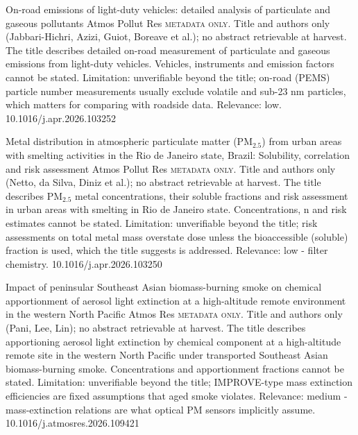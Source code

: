 \documentclass[10pt]{article}
\begin{document}
{On-road emissions of light-duty vehicles: detailed analysis of particulate and gaseous pollutants}
{Atmos Pollut Res}
{\textsc{metadata only.} Title and authors only (Jabbari-Hichri, Azizi, Guiot, Boreave et al.); no abstract retrievable at harvest. The title describes detailed on-road measurement of particulate and gaseous emissions from light-duty vehicles. Vehicles, instruments and emission factors cannot be stated. Limitation: unverifiable beyond the title; on-road (PEMS) particle number measurements usually exclude volatile and sub-23 nm particles, which matters for comparing with roadside data. Relevance: low.}
{10.1016/j.apr.2026.103252}

{Metal distribution in atmospheric particulate matter (PM$_{2.5}$) from urban areas with smelting activities in the Rio de Janeiro state, Brazil: Solubility, correlation and risk assessment}
{Atmos Pollut Res}
{\textsc{metadata only.} Title and authors only (Netto, da Silva, Diniz et al.); no abstract retrievable at harvest. The title describes PM$_{2.5}$ metal concentrations, their soluble fractions and risk assessment in urban areas with smelting in Rio de Janeiro state. Concentrations, n and risk estimates cannot be stated. Limitation: unverifiable beyond the title; risk assessments on total metal mass overstate dose unless the bioaccessible (soluble) fraction is used, which the title suggests is addressed. Relevance: low - filter chemistry.}
{10.1016/j.apr.2026.103250}

{Impact of peninsular Southeast Asian biomass-burning smoke on chemical apportionment of aerosol light extinction at a high-altitude remote environment in the western North Pacific}
{Atmos Res}
{\textsc{metadata only.} Title and authors only (Pani, Lee, Lin); no abstract retrievable at harvest. The title describes apportioning aerosol light extinction by chemical component at a high-altitude remote site in the western North Pacific under transported Southeast Asian biomass-burning smoke. Concentrations and apportionment fractions cannot be stated. Limitation: unverifiable beyond the title; IMPROVE-type mass extinction efficiencies are fixed assumptions that aged smoke violates. Relevance: medium - mass-extinction relations are what optical PM sensors implicitly assume.}
{10.1016/j.atmosres.2026.109421}
\end{document}

